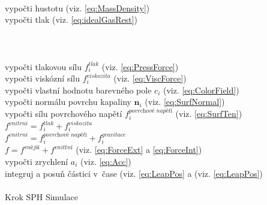 \begin{center}
	\begin{czechalgorithm}[H] \label{alg:SPH}
			 {\\
				vypočti hustotu (viz. \ref{eq:MassDensity})\\
				vypočti tlak (viz. \ref{eq:idealGasRest})\\
			}\\
			\\
			 {\\
				vypočti tlakovou sílu $f^{tlak}_i$ (viz. \ref{eq:PressForce})\\
				vypočti viskózní sílu $f^{viskozita}_i$ (viz. \ref{eq:ViscForce})\\
				vypočti vlastní hodnotu barevného pole $c_i$ (viz. \ref{eq:ColorField})\\
				vypočti normálu povrchu kapaliny $\mathbf{n}_i$ (viz. \ref{eq:SurfNormal})\\
				vypočti sílu povrchového napětí $f^{\textit{povrchové napětí}}_i$ (viz. \ref{eq:SurfTen})\\
				$f^{vnitrni} = f^{tlak}_i + f^{viskozita}_i$ \\
				$f^{vnitrni} = f^{\textit{povrchové napětí}}_i + f^{gravitace}_i$\\
				$f = f^{\textit{vnější}} + f^{\textit{vnitřní}}$ (viz. \ref{eq:ForceExt} a \ref{eq:ForceInt})\\
				vypočti zrychlení $a_i$ (viz. \ref{eq:Acc})\\
				integruj a posuň částici v~čase (viz. \ref{eq:LeapPos} a (viz. \ref{eq:LeapPos})\\
			}\\

		\caption{Krok SPH Simulace}
	\end{czechalgorithm}
\end{center}

